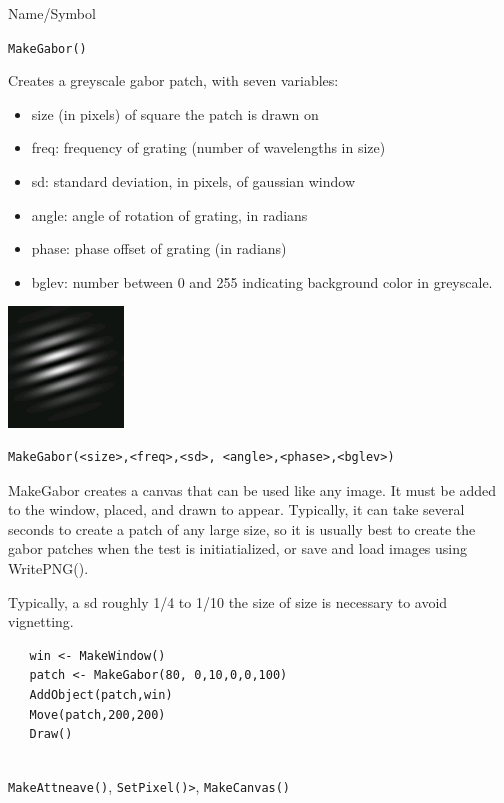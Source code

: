 \begin{desc}{Name/Symbol}
\item[Name/Symbol]	\verb+MakeGabor()+

\item[Description]
Creates a greyscale gabor patch, with seven variables:
\begin{itemize}
\item size (in pixels) of square the patch is drawn on
\item freq: frequency of grating (number of wavelengths in size)
\item sd: standard deviation, in pixels, of gaussian window
\item angle: angle of rotation of grating, in radians
\item phase: phase offset of grating (in radians)
\item bglev: number between 0 and 255 indicating background color in greyscale.
\end{itemize}

{
\center
\includegraphics{images/gabor.png}
}
\item[Usage]

\begin{verbatim}
MakeGabor(<size>,<freq>,<sd>, <angle>,<phase>,<bglev>)
\end{verbatim}
MakeGabor creates a canvas that can be used like any image.  It must be added to the window, placed, and drawn to appear.  Typically, it can take several seconds to create a patch of any large size, so it is usually best to create the gabor patches when the test is initiatialized, or save and load images using WritePNG().

Typically, a sd roughly 1/4 to 1/10 the size of size is necessary to avoid vignetting.

\item[Example]	
\begin{verbatim}
   win <- MakeWindow()
   patch <- MakeGabor(80, 0,10,0,0,100)
   AddObject(patch,win)
   Move(patch,200,200)
   Draw()
   
\end{verbatim}

\item[See Also]	
\verb+MakeAttneave()+, \verb+SetPixel()>+, \verb+MakeCanvas()+ 
\end{desc}



